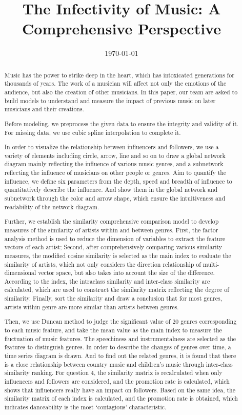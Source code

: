 \documentclass{mcmthesis}
\title{\large\textbf{The Infectivity of Music: A Comprehensive Perspective} }
\date{\today}
\begin{document}
\begin{abstract}
	\begin{spacing}{0.8}
Music has the power to strike deep in the heart, which has intoxicated generations for thousands of years. The work of a musician will affect not only the emotions of the audience, but also the creation of other musicians. In this paper, our team are asked to build models to understand and measure the impact of previous music on later musicians and their creations. 

Before modeling, we preprocess the given data to ensure the integrity and validity of it. For missing data, we use cubic spline interpolation to complete it.

In order to visualize the relationship between influencers and followers, we use a variety of elements including circle, arrow, line and so on to draw a global network diagram mainly reflecting the influence of various music genres, and a subnetwork reflecting the influence of musicians on other people or genres. Aim to quantify the influence, we define six parameters from the depth, speed and breadth of influence to quantitatively describe the influence. And show them in the global network and subnetwork through the color and arrow shape, which ensure the intuitiveness and readability of the network diagram.

Further, we establish the similarity comprehensive comparison model to develop measures of the similarity of artists within and between genres. First, the factor analysis method is used to reduce the dimension of variables to extract the feature vectors of each artist; Second, after comprehensively comparing various similarity measures, the modified cosine similarity is selected as the main index to evaluate the similarity of artists, which not only considers the direction relationship of multi-dimensional vector space, but also takes into account the size of the difference. According to the index, the intraclass similarity and inter-class similarity are calculated, which are used to construct the similarity matrix reflecting the degree of similarity. Finally, sort the similarity and draw a conclusion that for most genres, artists within genre are more similar than artists between genres.

Then, we use Duncan method to judge the significant value of 20 genres corresponding to each music feature, and take the mean value as the main index to measure the fluctuation of music features. The speechiness and instrumentalness are selected as the features to distinguish genres. In order to describe the changes of genres over time, a time series diagram is drawn. And to find out the related genres, it is found that there is a close relationship between country music and children’s music through inter-class similarity ranking. For question 4, the similarity matrix is recalculated when only influencers and followers are considered, and the promotion rate is calculated, which shows that influencers really have an impact on followers. Based on the same idea, the similarity matrix of each index is calculated, and the promotion rate is obtained, which indicates danceability is the most ‘contagious’ characteristic.


\end{spacing}
\end{abstract}
\end{document}
